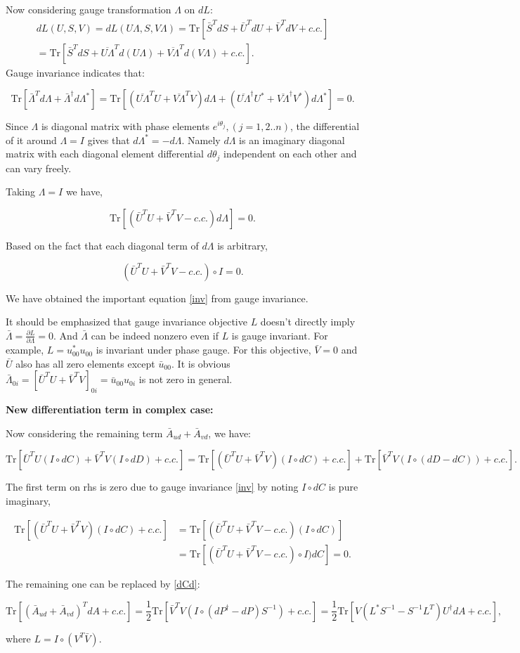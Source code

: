 \documentclass[aps,prl,singlecolumn,preprintnumbers,amsmath,amssymb,notitlepage]{revtex4-1}
\def\Tr{\mathrm{Tr}}
\newcommand{\<}{\langle}
\renewcommand{\>}{\rangle}
\newcommand{\p}{\partial}
\newcommand{\al}[1]{\begin{align}#1\end{align}}
\newcommand{\eq}[2]{
	\begin{equation}
	#1 \label{#2}
	\end{equation}
}
\begin{document}
Now considering gauge transformation $\Lambda$ on $dL$:
\al{dL(U, S, V)=dL(U\Lambda, S, V\Lambda)=\Tr[\bar{S}^TdS+\bar{U}^TdU+\bar{V}^TdV+c.c.]\nonumber\\
=\Tr[\bar{S}^TdS+\overline{U\Lambda}^T d(U\Lambda)+\overline{V\Lambda}^Td(V\Lambda)+c.c.].}
Gauge invariance indicates that:
\eq{\Tr[\bar{\Lambda}^Td\Lambda+\bar{\Lambda}^\dagger d\Lambda^*]=\Tr[(\overline{U\Lambda}^TU+\overline{V\Lambda}^TV)d\Lambda+(\overline{U\Lambda}^\dagger U^*+\overline{V\Lambda}^\dagger V^*)d\Lambda^*]=0.}{invp}
Since $\Lambda$ is diagonal matrix with phase elements $e^{i\theta_j}, (j=1,2..n)$, the differential of it around $\Lambda=I$ gives that $d\Lambda^* = -d\Lambda$. Namely $d\Lambda$ is an imaginary diagonal matrix with each diagonal element differential $d\theta_j$ independent on each other and can vary freely.

Taking $\Lambda=I$  we have, 
\eq{\Tr[(\bar{U}^TU+\bar{V}^TV-c.c.)d\Lambda]=0.}{}
Based on the fact that each diagonal term of $d\Lambda$ is arbitrary, 
\eq{(\bar{U}^TU+\bar{V}^TV-c.c.)\circ I=0.}{inv}
We have obtained the important equation \eqref{inv} from gauge invariance.

It should be emphasized that gauge invariance objective $L$ doesn't directly imply $\bar{\Lambda}=\frac{\p L}{\p \Lambda}=0$.
And $\bar{\Lambda}$ can be indeed nonzero even if $L$ is gauge invariant. For example, $L=u^*_{00}u_{00}$ is invariant under phase gauge. For this objective, $\bar{V}=0$ and $\bar{U}$ also has all zero elements except $\bar{u}_{00}$. It is obvious $\bar{\Lambda}_{0i}=[\bar{U}^TU+\bar{V}^TV]_{0i}=\bar{u}_{00}u_{0i}$ is not zero in general.

{\bf New differentiation term in complex case:} 

Now considering the remaining term $\bar{A}_{ud}+\bar{A}_{vd}$, we have:
\eq{\Tr[\bar{U}^TU(I\circ dC)+\bar{V}^TV(I\circ dD)+c.c.]=\Tr[(\bar{U}^TU+\bar{V}^TV)(I\circ dC)+c.c.]+\Tr[\bar{V}^TV(I\circ (dD -dC))+c.c.].}{dec}
The first term on rhs is zero due to gauge invariance \eqref{inv} by noting $I\circ dC$ is pure imaginary,
\eq{
\begin{split}
\Tr[(\bar{U}^TU+\bar{V}^TV)(I\circ dC)+c.c.]&=\Tr[(\bar{U}^TU+\bar{V}^TV-c.c.)(I\circ dC)]\\
&=\Tr[(\bar{U}^TU+\bar{V}^TV-c.c.)\circ I) dC]=0.
\end{split}
}{}
The remaining one can be replaced by \eqref{dCd}:
\eq{\Tr[(\bar{A}_{ud}+\bar{A}_{vd})^TdA+c.c.]=\frac{1}{2}\Tr[\bar{V}^TV(I\circ (dP^\dagger-dP)S^{-1})+c.c.]
=	\frac{1}{2}\Tr[V (L^* S^{-1}-S^{-1}L^T)U^\dagger dA+c.c.],}{arg2}
where $L=I\circ (V^T\bar{V})$.
\end{document}
